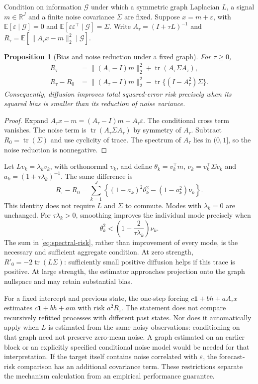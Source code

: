 \documentclass[12pt,a4paper]{article}
\newtheorem{proposition}{Proposition}
\newcommand{\E}{\mathbb E}
\newcommand{\R}{\mathbb R}
\newcommand{\one}{\mathbf 1}
\begin{document}
Condition on information $\mathcal G$ under which a symmetric graph Laplacian
$L$, a signal $m\in\R^J$ and a finite noise covariance $\Sigma$ are fixed. Suppose
$x=m+\varepsilon$, with $\E[\varepsilon\mid\mathcal G]=0$ and
$\E[\varepsilon\varepsilon^\top\mid\mathcal G]=\Sigma$. Write
$A_\tau=(I+\tau L)^{-1}$ and
$R_\tau=\E[\|A_\tau x-m\|_2^2\mid\mathcal G]$.

\begin{proposition}[Bias and noise reduction under a fixed graph]
\label{prop:diffusion-risk}
For $\tau\geq0$,
\begin{align}
R_\tau&=\|(A_\tau-I)m\|_2^2+
            \operatorname{tr}(A_\tau\Sigma A_\tau),\\
R_\tau-R_0&=\|(A_\tau-I)m\|_2^2-
            \operatorname{tr}\{(I-A_\tau^2)\Sigma\}.
\label{eq:diffusion-risk}
\end{align}
Consequently, diffusion improves total squared-error risk precisely when its
squared bias is smaller than its reduction of noise variance.
\end{proposition}
\begin{proof}
Expand $A_\tau x-m=(A_\tau-I)m+A_\tau\varepsilon$. The conditional cross term
vanishes. The noise term is $\operatorname{tr}(A_\tau\Sigma A_\tau)$ by symmetry
of $A_\tau$. Subtract $R_0=\operatorname{tr}(\Sigma)$ and use cyclicity of trace.
The spectrum of $A_\tau$ lies in $(0,1]$, so the noise reduction is nonnegative.
\end{proof}

Let $Lv_k=\lambda_kv_k$, with orthonormal $v_k$, and define
$\theta_k=v_k^\top m$, $\nu_k=v_k^\top\Sigma v_k$ and
$a_k=(1+\tau\lambda_k)^{-1}$. The same difference is
\begin{equation}
R_\tau-R_0=\sum_{k=1}^J\left\{
 (1-a_k)^2\theta_k^2-(1-a_k^2)\nu_k\right\}.
\label{eq:spectral-risk}
\end{equation}
This identity does not require $L$ and $\Sigma$ to commute. Modes with
$\lambda_k=0$ are unchanged. For $\tau\lambda_k>0$, smoothing improves the
individual mode precisely when
\[
\theta_k^2<\left(1+\frac{2}{\tau\lambda_k}\right)\nu_k.
\]
The sum in \eqref{eq:spectral-risk}, rather than improvement of every mode,
is the necessary and sufficient aggregate condition. At zero strength,
$R'_0=-2\operatorname{tr}(L\Sigma)$: sufficiently small positive diffusion
helps if this trace is positive. At large strength, the estimator approaches
projection onto the graph nullspace and may retain substantial bias.

For a fixed intercept and previous state, the one-step forcing
$c\one+b h+aA_\tau x$ estimates $c\one+b h+am$ with risk $a^2R_\tau$.
The statement does not compare recursively refitted processes with different
past states. Nor does it automatically apply when $L$ is estimated from the
same noisy observations: conditioning on that graph need not preserve
zero-mean noise. A graph estimated on an earlier block or an explicitly
specified conditional noise model would be needed for that interpretation.
If the target itself contains noise correlated with $\varepsilon$, the
forecast-risk comparison has an additional covariance term. These restrictions
separate the mechanism calculation from an empirical performance guarantee.
\end{document}
